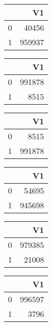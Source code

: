 \bigskip\bigskip
\centering
\begin{tabular}{rr}
  \hline
 & V1 \\ 
  \hline
0 & 40456 \\ 
  1 & 959937 \\ 
   \hline
\end{tabular}

\bigskip\bigskip
\centering
\begin{tabular}{rr}
  \hline
 & V1 \\ 
  \hline
0 & 991878 \\ 
  1 & 8515 \\ 
   \hline
\end{tabular}

\bigskip\bigskip
\centering
\begin{tabular}{rr}
  \hline
 & V1 \\ 
  \hline
0 & 8515 \\ 
  1 & 991878 \\ 
   \hline
\end{tabular}

\bigskip\bigskip
\centering
\begin{tabular}{rr}
  \hline
 & V1 \\ 
  \hline
0 & 54695 \\ 
  1 & 945698 \\ 
   \hline
\end{tabular}

\bigskip\bigskip
\centering
\begin{tabular}{rr}
  \hline
 & V1 \\ 
  \hline
0 & 979385 \\ 
  1 & 21008 \\ 
   \hline
\end{tabular}

\bigskip\bigskip
\centering
\begin{tabular}{rr}
  \hline
 & V1 \\ 
  \hline
0 & 996597 \\ 
  1 & 3796 \\ 
   \hline
\end{tabular}

